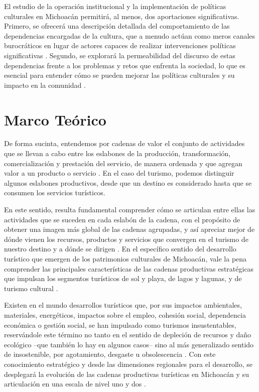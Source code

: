 \documentclass[
  spanish,
  11pt,
  a4paper,
]{scrbook}
\begin{document}
El estudio de la operación institucional y la implementación de
políticas culturales en Michoacán permitirá, al menos, dos aportaciones
significativas. Primero, se ofrecerá una descripción detallada del
comportamiento de las dependencias encargadas de la cultura, que a
menudo actúan como meros canales burocráticos en lugar de actores
capaces de realizar intervenciones políticas significativas
\autocite{MendezMartinez2020}. Segundo, se explorará la permeabilidad
del discurso de estas dependencias frente a los problemas y retos que
enfrenta la sociedad, lo que es esencial para entender cómo se pueden
mejorar las políticas culturales y su impacto en la comunidad
\autocite{Cantar2021}.

\section*{Marco Teórico}\label{marco-teuxf3rico}


De forma sucinta, entendemos por cadenas de valor el conjunto de
actividades que se llevan a cabo entre los eslabones de la producción,
transformación, comercialización y prestación del servicio, de manera
ordenada y que agregan valor a un producto o servicio
\autocite{Porter1985}. En el caso del turismo, podemos distinguir
algunos eslabones productivos, desde que un destino es considerado hasta
que se consumen los servicios turísticos.

En este sentido, resulta fundamental comprender cómo se articulan entre
ellas las actividades que se suceden en cada eslabón de la cadena, con
el propósito de obtener una imagen más global de las cadenas agrupadas,
y así apreciar mejor de dónde vienen los recursos, productos y servicios
que convergen en el turismo de nuestro destino y a dónde se dirigen
\autocite{Roige2019}. En el específico sentido del desarrollo turístico
que emergen de los patrimonios culturales de Michoacán, vale la pena
comprender las principales características de las cadenas productivas
estratégicas que impulsan los segmentos turísticos de sol y playa, de
lagos y lagunas, y de turismo cultural \autocite{MendezBahena2016}.

Existen en el mundo desarrollos turísticos que, por sus impactos
ambientales, materiales, energéticos, impactos sobre el empleo, cohesión
social, dependencia económica o gestión social, se han impulsado como
turismos insustentables, reservándole este término no tanto en el
sentido de depleción de recursos y daño ecológico --que también lo hay
en algunos casos-- sino al más generalizado sentido de insostenible, por
agotamiento, desgaste u obsolescencia \autocite{FernandezLaso2022}. Con
este conocimiento estratégico y desde las dimensiones regionales para el
desarrollo, se desplegará la evolución de las cadenas productivas
turísticas en Michoacán y su articulación en una escala de nivel uno y
dos \autocite{Jimenez2019a}.
\end{document}
